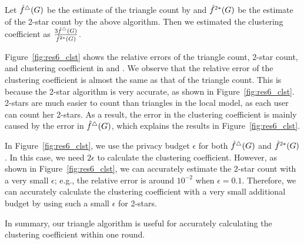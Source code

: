 Let $\hat{f}^\triangle(G)$ be the estimate of the triangle count by \AlgWSTriVR{} and $\hat{f}^{2*}(G)$ be the estimate of the 2-star count by the above algorithm.
Then we estimated the clustering coefficient as $\frac{3 \hat{f}^\triangle(G)}{\hat{f}^{2*}(G)}$.

Figure~\ref{fig:res6_clst} shows the relative errors of the triangle count, 2-star count, and clustering coefficient in \Gplus{} and \IMDB{}.
We observe that the relative error of the clustering coefficient is almost the same as that of the triangle count.
This is because the 2-star algorithm is very accurate, as shown in Figure~\ref{fig:res6_clst}.
2-stars are much easier to count than triangles in the local model, as each user can count her 2-stars.
As a result, the error in the clustering coefficient is mainly caused by the error in $\hat{f}^\triangle(G)$, which explains the results in Figure~\ref{fig:res6_clst}.

In Figure~\ref{fig:res6_clst}, we use the privacy budget $\epsilon$ for both $\hat{f}^\triangle(G)$ and $\hat{f}^{2*}(G)$.
In this case, we need $2\epsilon$ to calculate the clustering coefficient.
However, as shown in Figure~\ref{fig:res6_clst}, we can accurately estimate the 2-star count with a very small $\epsilon$; e.g., the relative error is around $10^{-2}$ when $\epsilon=0.1$.
Therefore, we can accurately calculate the clustering coefficient
with a very small additional budget
by using such a small $\epsilon$ for 2-stars.

In summary, our triangle algorithm \AlgWSTriVR{} is useful for accurately calculating the clustering coefficient within one round.

